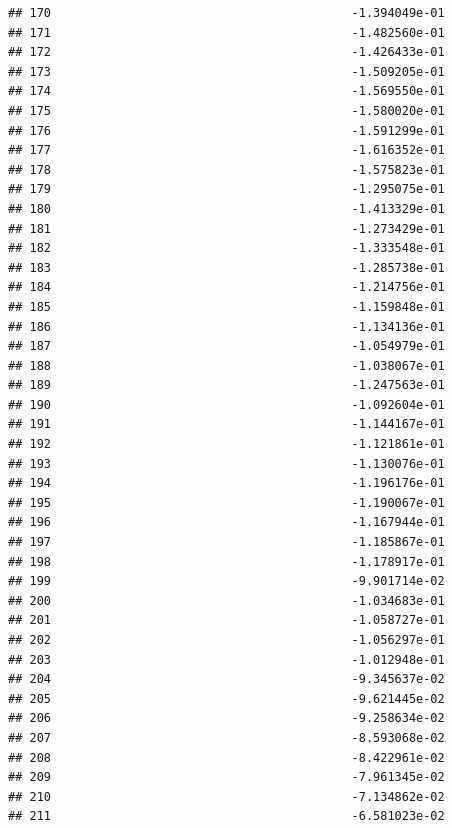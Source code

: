 \documentclass[
]{article}
\begin{document}
\begin{verbatim}
## 170                                          -1.394049e-01
## 171                                          -1.482560e-01
## 172                                          -1.426433e-01
## 173                                          -1.509205e-01
## 174                                          -1.569550e-01
## 175                                          -1.580020e-01
## 176                                          -1.591299e-01
## 177                                          -1.616352e-01
## 178                                          -1.575823e-01
## 179                                          -1.295075e-01
## 180                                          -1.413329e-01
## 181                                          -1.273429e-01
## 182                                          -1.333548e-01
## 183                                          -1.285738e-01
## 184                                          -1.214756e-01
## 185                                          -1.159848e-01
## 186                                          -1.134136e-01
## 187                                          -1.054979e-01
## 188                                          -1.038067e-01
## 189                                          -1.247563e-01
## 190                                          -1.092604e-01
## 191                                          -1.144167e-01
## 192                                          -1.121861e-01
## 193                                          -1.130076e-01
## 194                                          -1.196176e-01
## 195                                          -1.190067e-01
## 196                                          -1.167944e-01
## 197                                          -1.185867e-01
## 198                                          -1.178917e-01
## 199                                          -9.901714e-02
## 200                                          -1.034683e-01
## 201                                          -1.058727e-01
## 202                                          -1.056297e-01
## 203                                          -1.012948e-01
## 204                                          -9.345637e-02
## 205                                          -9.621445e-02
## 206                                          -9.258634e-02
## 207                                          -8.593068e-02
## 208                                          -8.422961e-02
## 209                                          -7.961345e-02
## 210                                          -7.134862e-02
## 211                                          -6.581023e-02

\end{verbatim}
\end{document}
